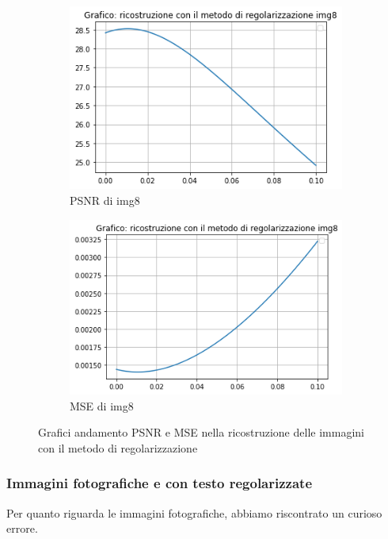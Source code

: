 \begin{figure}[H]\ContinuedFloat
    \centering
    \begin{subfigure}{0.5\textwidth}
        \centering
        \includegraphics[width=\textwidth]{output/PSNR/outputPSNR-img8.png}
        \caption{PSNR di img8}
        \label{fig:img8PSNR}
    \end{subfigure}\hfill
    \begin{subfigure}{0.5\textwidth}
        \centering
        \includegraphics[width=\textwidth]{output/MSE/outputMSE-img8.png}
        \caption{MSE di img8}
        \label{fig:img8MSE}
    \end{subfigure}
\caption{Grafici andamento PSNR e MSE nella ricostruzione delle immagini con il metodo di regolarizzazione}
\end{figure}

\subsubsection{Immagini fotografiche e con testo regolarizzate}
Per quanto riguarda le immagini fotografiche, abbiamo riscontrato un curioso errore. 

